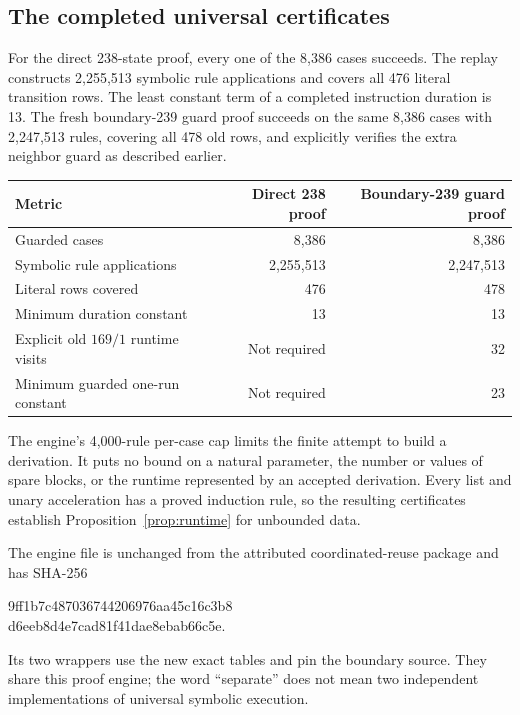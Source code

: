 \subsection{The completed universal certificates}

For the direct 238-state proof, every one of the 8,386 cases succeeds.
The replay constructs 2,255,513 symbolic rule applications and covers all
476 literal transition rows. The least constant term of a completed
instruction duration is 13. The fresh boundary-239 guard proof succeeds
on the same 8,386 cases with 2,247,513 rules, covering all 478 old rows,
and explicitly verifies the extra neighbor guard as described earlier.

\begin{center}
\begin{tabular}{lrr}
\toprule
Metric & Direct 238 proof & Boundary-239 guard proof \\
\midrule
Guarded cases & 8,386 & 8,386 \\
Symbolic rule applications & 2,255,513 & 2,247,513 \\
Literal rows covered & 476 & 478 \\
Minimum duration constant & 13 & 13 \\
Explicit old $169/1$ runtime visits & Not required & 32 \\
Minimum guarded one-run constant & Not required & 23 \\
\bottomrule
\end{tabular}
\end{center}

The engine's 4,000-rule per-case cap limits the finite attempt to build
a derivation. It puts no bound on a natural parameter, the number or
values of spare blocks, or the runtime represented by an accepted
derivation. Every list and unary acceleration has a proved induction
rule, so the resulting certificates establish Proposition~\ref{prop:runtime}
for unbounded data.

The engine file is unchanged from the attributed coordinated-reuse
package and has SHA-256
\begin{center}\small\ttfamily
9ff1b7c487036744206976aa45c16c3b8\\
d6eeb8d4e7cad81f41dae8ebab66c5e.
\end{center}
Its two wrappers use the new exact tables and pin the boundary source.
They share this proof engine; the word ``separate'' does not mean two
independent implementations of universal symbolic execution.

